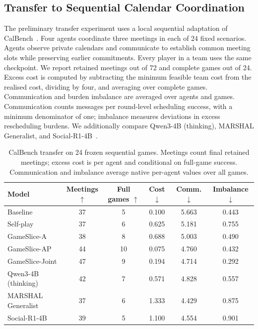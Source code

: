 \documentclass[11pt,a4paper]{article}
\begin{document}
\subsection{Transfer to Sequential Calendar Coordination}
The preliminary transfer experiment uses a local sequential adaptation
of CalBench~\cite{zou2026calbench}. Four agents coordinate three meetings in each
of 24 fixed scenarios. Agents observe private calendars and communicate
to establish common meeting slots while preserving earlier commitments.
Every player in a team uses the same checkpoint. We report retained
meetings out of 72 and complete games out of 24. Excess cost is computed
by subtracting the minimum feasible team cost from the realised cost,
dividing by four, and averaging over complete games. Communication and
burden imbalance are averaged over agents and games. Communication counts
messages per round-level scheduling success, with a minimum denominator
of one; imbalance measures deviations in excess rescheduling burdens.
We additionally compare
Qwen3-4B (thinking), MARSHAL Generalist, and Social-R1-4B~\cite{wu2026socialr1}.

\begin{table}[tb]
\caption{CalBench transfer on 24 frozen sequential games. Meetings count
final retained meetings; excess cost is per agent and conditional on full-game
success. Communication and imbalance average native per-agent values over all
games.}
\label{tab:transfer}
\centering\small
\setlength{\tabcolsep}{4pt}
\begin{tabular}{lccccc}
\hline
Model & Meetings $\uparrow$ & Full games $\uparrow$ & Cost $\downarrow$ & Comm. $\downarrow$ & Imbalance $\downarrow$ \\
\hline
Baseline & 37 & 5 & 0.100 & 5.663 & 0.443 \\
Self-play & 37 & 6 & 0.625 & 5.181 & 0.755 \\
GameSlice-A & 38 & 8 & 0.688 & 5.003 & 0.490 \\
GameSlice-AP & 44 & 10 & 0.075 & 4.760 & 0.432 \\
GameSlice-Joint & 47 & 9 & 0.194 & 4.714 & 0.292 \\
\hline
Qwen3-4B (thinking) & 42 & 7 & 0.571 & 4.828 & 0.557 \\
MARSHAL Generalist & 37 & 6 & 1.333 & 4.429 & 0.875 \\
Social-R1-4B & 39 & 5 & 1.100 & 4.554 & 0.901 \\
\hline
\end{tabular}
\end{table}
\end{document}
